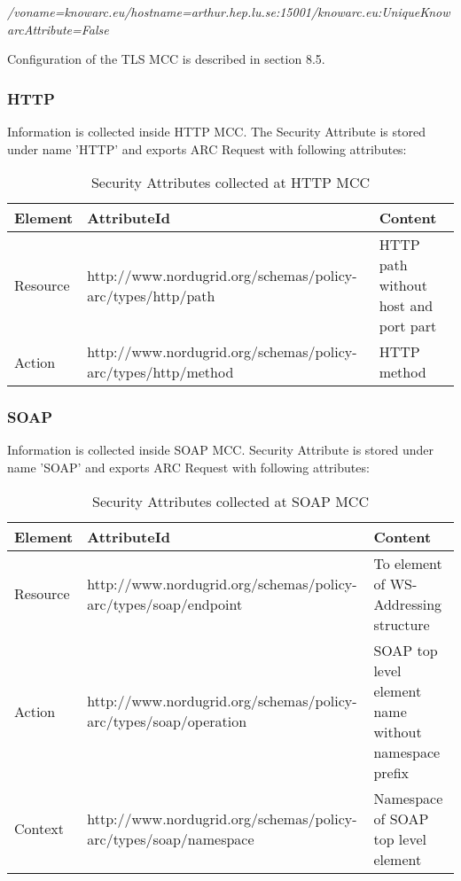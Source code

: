 \documentclass{book}
\begin{document}
\emph{/voname=knowarc.eu/hostname=arthur.hep.lu.se:15001/knowarc.eu:UniqueKnowarcAttribute=False}

Configuration of the TLS MCC is described in section 8.5.



\subsubsection{HTTP} %
\label{subsubsec:sec_attr_HTTP}
Information is collected inside HTTP MCC. The Security Attribute is stored under name 'HTTP' and exports ARC Request with following attributes:

\begin{table}[ht]
\caption{Security Attributes collected at HTTP MCC}
\centering
\begin{tabular}{| l | p{7cm} | p{5cm} |}
\hline
\textbf{Element} & \textbf{AttributeId} & \textbf{Content} \\ \hline
Resource & http://www.nordugrid.org/schemas/policy-arc/types/http/path & HTTP path without host and port part \\ \hline
Action & http://www.nordugrid.org/schemas/policy-arc/types/http/method & HTTP method \\ \hline
\end{tabular}
\label{table:http_attr}
\end{table}


\subsubsection{SOAP} %
\label{subsubsec:sec_attr_SOAP}
Information is collected inside SOAP MCC. Security Attribute is stored under name 'SOAP' and exports ARC Request with following attributes:

\begin{table}[ht]
\caption{Security Attributes collected at SOAP MCC}
\centering
\begin{tabular}{| l | p{7cm} | p{5cm} |}
\hline
\textbf{Element} & \textbf{AttributeId} & \textbf{Content} \\ \hline
Resource & http://www.nordugrid.org/schemas/policy-arc/types/soap/endpoint & To element of WS-Addressing structure \\ \hline
Action & http://www.nordugrid.org/schemas/policy-arc/types/soap/operation & SOAP top level element name without namespace prefix \\ \hline
Context & http://www.nordugrid.org/schemas/policy-arc/types/soap/namespace & Namespace of SOAP top level element \\ \hline
\end{tabular}
\label{table:soap_attr}
\end{table}
\end{document}
